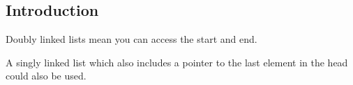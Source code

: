 
\subsection{Introduction}

Doubly linked lists mean you can access the start and end.

A singly linked list which also includes a pointer to the last element in the head could also be used.
